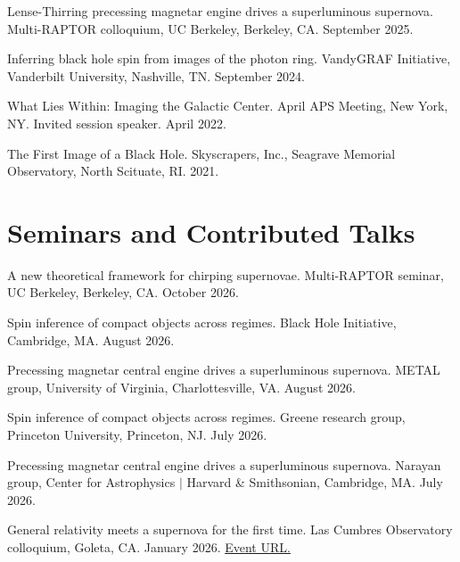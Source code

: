 \documentclass[margin,line]{res}
\begin{document}
\begin{resume}
\vspace*{-2mm}
Lense-Thirring precessing magnetar engine drives a superluminous supernova. Multi-RAPTOR colloquium, UC Berkeley, Berkeley, CA. September 2025.

\vspace*{-2mm}
Inferring black hole spin from images of the photon ring. VandyGRAF Initiative, Vanderbilt University, Nashville, TN. September 2024.

\vspace*{-2mm}
What Lies Within: Imaging the Galactic Center. April APS Meeting, New York, NY. Invited session speaker. April 2022.

\vspace*{-2mm}
The First Image of a Black Hole. Skyscrapers, Inc., Seagrave Memorial Observatory, North Scituate, RI. 2021.



\vspace{+.2cm}
\section{\sc Seminars and Contributed Talks}

A new theoretical framework for chirping supernovae. Multi-RAPTOR seminar, UC Berkeley, Berkeley, CA. October 2026.

\vspace*{-2mm}
Spin inference of compact objects across regimes. Black Hole Initiative, Cambridge, MA. August 2026.

\vspace*{-2mm}
Precessing magnetar central engine drives a superluminous supernova. METAL group, University of Virginia, Charlottesville, VA. August 2026.

\vspace*{-2mm}
Spin inference of compact objects across regimes. Greene research group, Princeton University, Princeton, NJ. July 2026.

\vspace*{-2mm}
Precessing magnetar central engine drives a superluminous supernova. Narayan group, Center for Astrophysics $|$ Harvard \& Smithsonian, Cambridge, MA. July 2026.


\vspace*{-2mm}
General relativity meets a supernova for the first time. Las Cumbres Observatory colloquium, Goleta, CA. January 2026. {\color{blue}\href{https://lco.global/seminar/jfarah/}{Event URL.}}


\end{resume}
\end{document}
